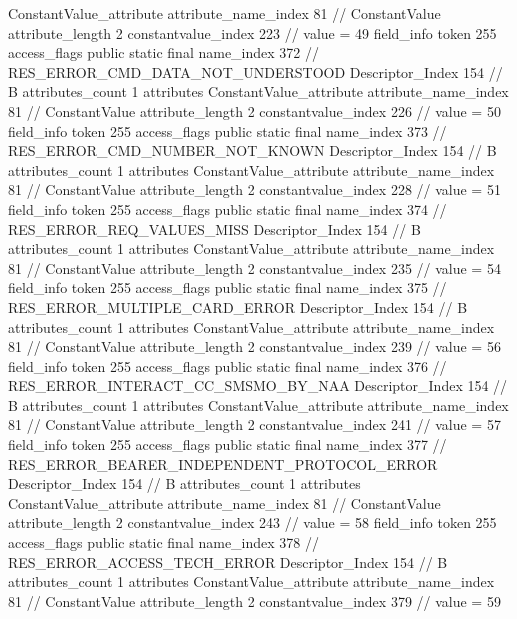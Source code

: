 {{{{{{				ConstantValue_attribute {
					attribute_name_index	81		// ConstantValue
					attribute_length	2
					constantvalue_index	223		// value = 49
				}
				}
			}
			field_info {
				token	255
				access_flags	public static final
				name_index	372		// RES_ERROR_CMD_DATA_NOT_UNDERSTOOD
				Descriptor_Index	154		// B
				attributes_count	1
				attributes {
				ConstantValue_attribute {
					attribute_name_index	81		// ConstantValue
					attribute_length	2
					constantvalue_index	226		// value = 50
				}
				}
			}
			field_info {
				token	255
				access_flags	public static final
				name_index	373		// RES_ERROR_CMD_NUMBER_NOT_KNOWN
				Descriptor_Index	154		// B
				attributes_count	1
				attributes {
				ConstantValue_attribute {
					attribute_name_index	81		// ConstantValue
					attribute_length	2
					constantvalue_index	228		// value = 51
				}
				}
			}
			field_info {
				token	255
				access_flags	public static final
				name_index	374		// RES_ERROR_REQ_VALUES_MISS
				Descriptor_Index	154		// B
				attributes_count	1
				attributes {
				ConstantValue_attribute {
					attribute_name_index	81		// ConstantValue
					attribute_length	2
					constantvalue_index	235		// value = 54
				}
				}
			}
			field_info {
				token	255
				access_flags	public static final
				name_index	375		// RES_ERROR_MULTIPLE_CARD_ERROR
				Descriptor_Index	154		// B
				attributes_count	1
				attributes {
				ConstantValue_attribute {
					attribute_name_index	81		// ConstantValue
					attribute_length	2
					constantvalue_index	239		// value = 56
				}
				}
			}
			field_info {
				token	255
				access_flags	public static final
				name_index	376		// RES_ERROR_INTERACT_CC_SMSMO_BY_NAA
				Descriptor_Index	154		// B
				attributes_count	1
				attributes {
				ConstantValue_attribute {
					attribute_name_index	81		// ConstantValue
					attribute_length	2
					constantvalue_index	241		// value = 57
				}
				}
			}
			field_info {
				token	255
				access_flags	public static final
				name_index	377		// RES_ERROR_BEARER_INDEPENDENT_PROTOCOL_ERROR
				Descriptor_Index	154		// B
				attributes_count	1
				attributes {
				ConstantValue_attribute {
					attribute_name_index	81		// ConstantValue
					attribute_length	2
					constantvalue_index	243		// value = 58
				}
				}
			}
			field_info {
				token	255
				access_flags	public static final
				name_index	378		// RES_ERROR_ACCESS_TECH_ERROR
				Descriptor_Index	154		// B
				attributes_count	1
				attributes {
				ConstantValue_attribute {
					attribute_name_index	81		// ConstantValue
					attribute_length	2
					constantvalue_index	379		// value = 59
}}}}}}}
